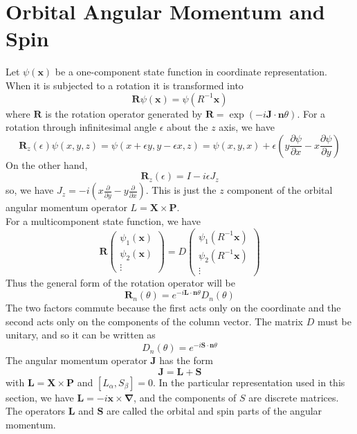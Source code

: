 \documentclass[cyan]{elegantnote}
\begin{document}
\section{Orbital Angular Momentum and Spin}
Let $\psi(\bm{x})$ be a one-component state function in coordinate representation. When it is subjected to a rotation it is transformed into
\[\bm{R}\psi(\bm{x}) = \psi(R^{-1}\bm{x})\]
where $\bm{R}$ is the rotation operator generated by $\bm{R} = \exp(-i\bm{J}\cdot\bm{n}\theta)$. For a rotation through infinitesimal angle $\epsilon$ about the $z$ axis, we have
\[\bm{R}_z(\epsilon) \psi(x,y,z) = \psi(x+\epsilon y,y-\epsilon x,z) = \psi(x,y,x) + \epsilon (y \frac{\partial \psi}{\partial x} - x \frac{\partial \psi}{\partial y})\]
On the other hand, 
\[\bm{R}_z(\epsilon) = I - i\epsilon J_z\]
so, we have $J_z = -i(x \frac{\partial}{\partial y} - y \frac{\partial}{\partial x})$. This is just the $z$ component of the orbital angular momentum operator $L = \bm{X} \times \bm{P}$.\\
For a multicomponent state function, we have
\[\bm{R} \left( \begin{matrix} \psi_1(\bm{x}) \\ \psi_2(\bm{x}) \\  \vdots \end{matrix} \right) = D \left( \begin{matrix} \psi_1(R^{-1}\bm{x}) \\ \psi_2(R^{-1}\bm{x}) \\  \vdots \end{matrix} \right)\]
Thus the general form of the rotation operator will be
\[\bm{R}_{n}(\theta) = e^{-i\bm{L}\cdot\bm{n}\theta}D_n(\theta)\]
The two factors commute because the first acts only on the coordinate and the second acts only on the components of the column vector. The matrix $D$ must be unitary, and so it can be written as
\[D_n(\theta) = e^{-i\bm{S}\cdot\bm{n}\theta}\]
The angular momentum operator $\bm{J}$ has the form
\[\bm{J} = \bm{L} + \bm{S}\]
with $\bm{L} = \bm{X} \times \bm{P}$ and $[L_{\alpha},S_{\beta}] = 0$. In the particular representation used in this section, we have $\bm{L} = -i\bm{x}\times\bm{\nabla}$, and the components of $S$ are
discrete matrices. The operators $\bm{L}$ and $\bm{S}$ are called the orbital and spin parts of the angular momentum.
\end{document}
